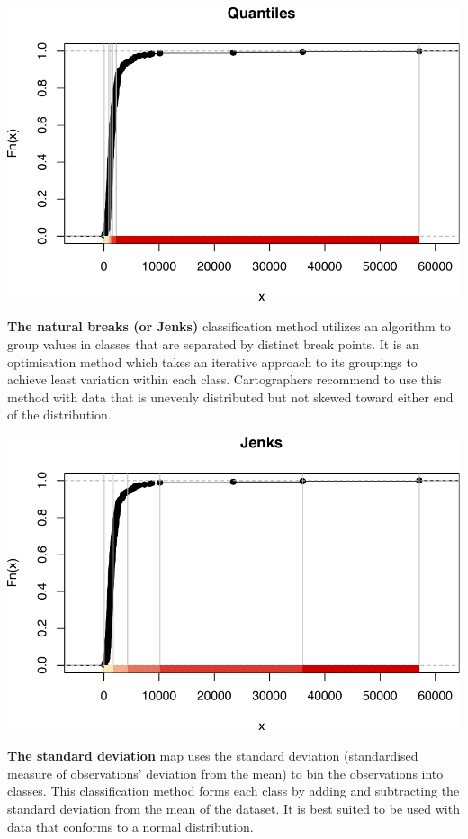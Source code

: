 \documentclass[
]{book}
\begin{document}
\includegraphics{crime_mapping_files/figure-latex/unnamed-chunk-91-1.pdf}

\textbf{The natural breaks (or Jenks)} classification method utilizes an algorithm to group values in classes that are separated by distinct break points. It is an optimisation method which takes an iterative approach to its groupings to achieve least variation within each class. Cartographers recommend to use this method with data that is unevenly distributed but not skewed toward either end of the distribution.

\includegraphics{crime_mapping_files/figure-latex/unnamed-chunk-92-1.pdf}

\textbf{The standard deviation} map uses the standard deviation (standardised measure of observations' deviation from the mean) to bin the observations into classes. This classification method forms each class by adding and subtracting the standard deviation from the mean of the dataset. It is best suited to be used with data that conforms to a normal distribution.
\end{document}
